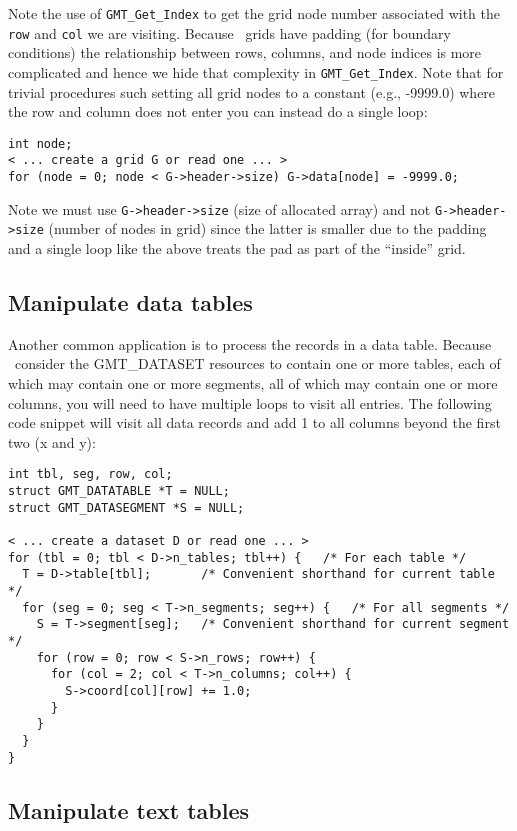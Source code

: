 \documentclass[11pt]{report}
\begin{document}
Note the use of \texttt{GMT\_Get\_Index} to get the grid node number associated
with the \texttt{row} and \texttt{col} we are visiting.  Because \GMT\ grids have
padding (for boundary conditions) the relationship between rows, columns, and
node indices is more complicated and hence we hide that complexity in \texttt{GMT\_Get\_Index}.
Note that for trivial procedures such setting all grid nodes to a constant (e.g., -9999.0)
where the row and column does not enter you can instead do a single loop:

\begin{verbatim}
int node;
< ... create a grid G or read one ... >
for (node = 0; node < G->header->size) G->data[node] = -9999.0;
\end{verbatim}

Note we must use \texttt{G->header->size} (size of allocated array) and not
\texttt{G->header->size} (number of nodes in grid) since the latter is smaller
due to the padding and a single loop like the above treats the pad as part of
the ``inside'' grid.

\subsection{Manipulate data tables}

Another common application is to process the records in a data table.
Because \GMT\ consider the GMT\_DATASET resources to contain one or
more tables, each of which may contain one or more segments, all of
which may contain one or more columns, you will need to have multiple
loops to visit all entries.  The following code snippet will visit
all data records and add 1 to all columns beyond the first two (x and y):

\begin{verbatim}
int tbl, seg, row, col;
struct GMT_DATATABLE *T = NULL;
struct GMT_DATASEGMENT *S = NULL;

< ... create a dataset D or read one ... >
for (tbl = 0; tbl < D->n_tables; tbl++) {	/* For each table */
  T = D->table[tbl];       /* Convenient shorthand for current table */
  for (seg = 0; seg < T->n_segments; seg++) {	/* For all segments */
    S = T->segment[seg];   /* Convenient shorthand for current segment */
    for (row = 0; row < S->n_rows; row++) {
      for (col = 2; col < T->n_columns; col++) {
        S->coord[col][row] += 1.0;
      }
    }
  }
}
\end{verbatim}

\subsection{Manipulate text tables}
\end{document}
